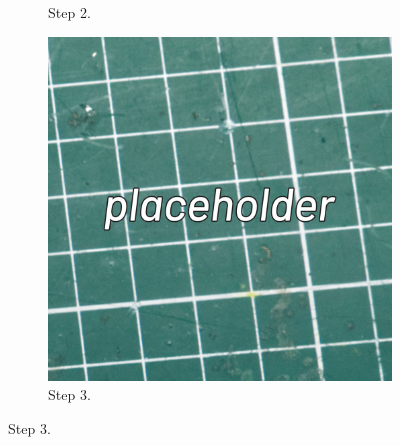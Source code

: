 \documentclass[12pt, a4paper]{article}
\begin{document}
\begin{figure}[H]
\begin{subfigure}{0.3\textwidth}
        \caption*{Step 2.}
    \end{subfigure}
    \hspace{2mm}
    \begin{subfigure}{0.3\textwidth}
        \includegraphics[width=\textwidth]{images/placeholder.jpg}
        \caption*{Step 3.}
    \end{subfigure}
\end{figure}
\label{fig:step1-3}

\vspace*{-6mm}
\end{document}
